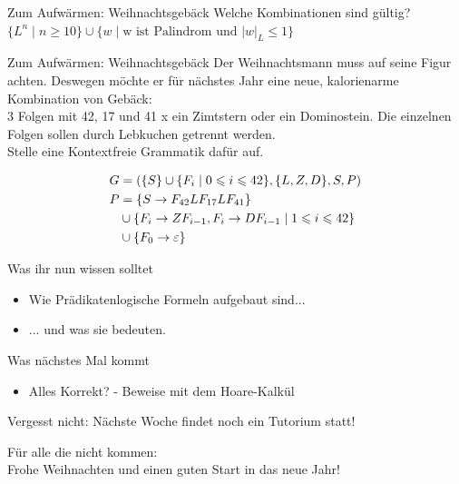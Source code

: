 {\begin{frame}{Zum Aufwärmen: Weihnachtsgebäck}
	Welche Kombinationen sind gültig?\\[0.5em] \pause
	$\{ L^n \mid n \geq 10\} \cup \{w \mid \text{w ist Palindrom und } |w|_L \leq 1\}$
\end{frame}

\begin{frame}{Zum Aufwärmen: Weihnachtsgebäck}
	Der Weihnachtsmann muss auf seine Figur achten. Deswegen möchte er für nächstes Jahr eine neue, kalorienarme Kombination von Gebäck:\\
	3 Folgen mit 42, 17 und 41 x ein Zimtstern oder ein Dominostein. Die einzelnen Folgen sollen durch Lebkuchen getrennt werden.\\
	Stelle eine Kontextfreie Grammatik dafür auf.
	
	\pause
	\begin{align*}
		G &= (\{S\} \cup \{F_i \mid 0 \leqslant i \leqslant 42 \}, \{L, Z, D\}, S, P)\\
		P &= \{S \to F_{42}LF_{17}LF_{41} \}\\
		  &\cup \{F_i \to ZF_{i-1}, F_i \to DF_{i-1} \mid 1 \leqslant i \leqslant 42 \} \\
		  &\cup \{F_0 \to \varepsilon \}
	\end{align*}
\end{frame}
}




\begin{frame}	
	\begin{block}{Was ihr nun wissen solltet}
		\begin{itemize}
			\item Wie Prädikatenlogische Formeln aufgebaut sind...
			\item ... und was sie bedeuten.
		\end{itemize}
	\end{block}
	
	\begin{block}{Was nächstes Mal kommt}
		\begin{itemize}
			\item Alles Korrekt? - Beweise mit dem Hoare-Kalkül
		\end{itemize}
	\end{block}
\end{frame}

\begin{frame}[plain]
	\begin{center}
		\large
		Vergesst nicht: Nächste Woche findet noch ein Tutorium statt!
	\end{center}
	\bigskip
	Für alle die nicht kommen: \\
	Frohe Weihnachten und einen guten Start in das neue Jahr!
\end{frame}

\slideThanks

